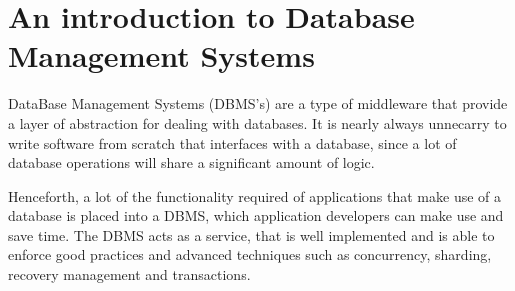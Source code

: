 
\section{An introduction to Database Management Systems}

DataBase Management Systems (DBMS's) are a type of middleware that provide a
layer of abstraction for dealing with databases. It is nearly always unnecarry
to write software from scratch that interfaces with a database, since a lot of
database operations will share a significant amount of logic.

Henceforth, a lot of the functionality required of applications that make use of
a database is placed into a DBMS, which application developers can make use and
save time. The DBMS acts as a service, that is well implemented and is able to
enforce good practices and advanced techniques such as concurrency, sharding,
recovery management and transactions.
